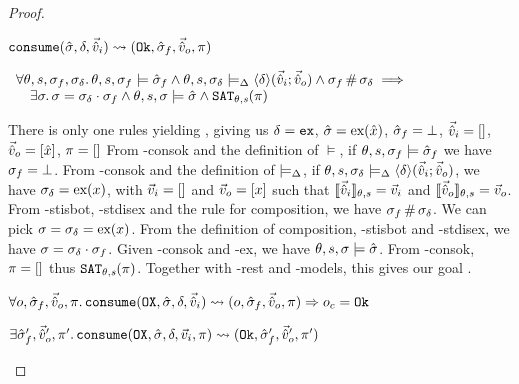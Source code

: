 \begin{proof}

\pfassume \begin{hypvlist}
 $\texttt{consume}(\hat{\sigma},\delta,\vec{\hat{v}}_i)\rightsquigarrow (\texttt{Ok},\hat{\sigma}_f,\vec{\hat{v}}_o,\pi)$
\end{hypvlist}
\pfprove \begin{goalvlist}
 $\begin{array}{l}
\forall \theta,s,\sigma_f,\sigma_\delta\ldotp \theta,s,\sigma_f\models \hat{\sigma}_f \land \theta, s, \sigma_\delta \models_{\Delta} \left<\delta\right>\!(\vec{\hat{v}}_i;\vec{\hat{v}}_o) \land \sigma_f\operatorname{\#}\sigma_\delta \implies \\
\quad \exists \sigma\ldotp \sigma = \sigma_\delta \cdot \sigma_f \land \theta,s,\sigma\models \hat{\sigma} \land \texttt{SAT}_{\mathit{\theta,s}}(\pi)
\end{array}$
\end{goalvlist}
\begin{hypvlist}
 There is only one \consume{} rules yielding \Ok, giving us $\delta=\texttt{ex}$, $\hat{\sigma}=\text{ex}(\hat{x})$, $\hat{\sigma}_f=\bot$, $\vec{\hat{v}}_i=[]$, $\vec{\hat{v}}_o=[\hat{x}]$, $\pi=[]$
 From \hyp{consok} and the definition of $\models$, if $\theta,s,\sigma_f\models\hat{\sigma}_f$ we have $\sigma_f=\bot$.
 From \hyp{consok} and the definition of $\models_{\Delta}$, if $\theta,s,\sigma_\delta\models_{\Delta}\left<\delta\right>\!(\vec{\hat{v}}_i;\vec{\hat{v}}_o)$, we have $\sigma_\delta=\text{ex}(x)$, with $\vec{v}_i=[]$ and $\vec{v}_o=[x]$ such that $\llbracket\vec{\hat{v}}_i\rrbracket_{\theta,s}=\vec{v}_i$ and $\llbracket\vec{\hat{v}}_o\rrbracket_{\theta,s}=\vec{v}_o$.
 From \hyp{stisbot}, \hyp{stdisex} and the rule for composition, we have $\sigma_f\operatorname{\#}\sigma_\delta$.
 We can pick $\sigma=\sigma_\delta=\text{ex}(x)$.
 From the definition of composition, \hyp{stisbot} and \hyp{stdisex}, we have $\sigma=\sigma_\delta\cdot\sigma_f$.
 Given \hyp{consok} and \hyp{ex}, we have $\theta,s,\sigma\models\hat{\sigma}$.
 From \hyp{consok}, $\pi=[]$ thus $\texttt{SAT}_{\mathit{\theta,s}}(\pi)$. Together with \hyp{rest} and \hyp{models}, this gives our goal .
\end{hypvlist}


\pfassume \begin{hypvlist}
 $\forall o, \hat{\sigma}_f,\vec{\hat{v}}_o,\pi \ldotp \texttt{consume}(\texttt{OX},\hat{\sigma},\delta,\vec{\hat{v}}_i)\rightsquigarrow (o, \hat{\sigma}_f, \vec{\hat{v}}_o, \pi)\Rightarrow o_c = \texttt{Ok}$
\end{hypvlist}
\pfprove \begin{goalvlist}
 $\exists  \hat{\sigma}_f',\vec{\hat{v}}_o',\pi' \ldotp \texttt{consume}(\texttt{OX}, \hat{\sigma}, \delta,\vec{v}_i,\pi)\rightsquigarrow (\texttt{Ok}, \hat{\sigma}_f', \vec{\hat{v}}_o', \pi')$
\end{goalvlist}


\end{proof}
